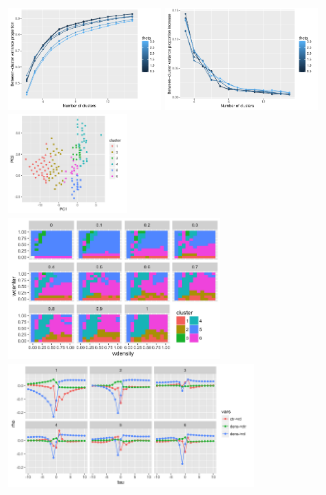 \begin{figure}%
\hspace{-1cm}
\includegraphics[width=0.36\textwidth]{figures/caus_ccoef-knum_valuesFALSE_theta05-3.pdf}
\includegraphics[width=0.36\textwidth]{figures/caus_dccoef-knum_valuesFALSEtheta05-3.pdf}
\includegraphics[width=0.28\textwidth]{figures/caus_clusters-PCA-features_valuesFALSEtheta2_k6}\\\hspace{-1cm}
\includegraphics[width=0.5\textwidth]{figures/caus_clusters-paramfacet_valuesFALSEtheta2_k6}
\includegraphics[width=0.58\textwidth]{figures/caus_clusters-centertrajs-facetclust_valuesFALSEtheta2_k6}

\end{figure}
